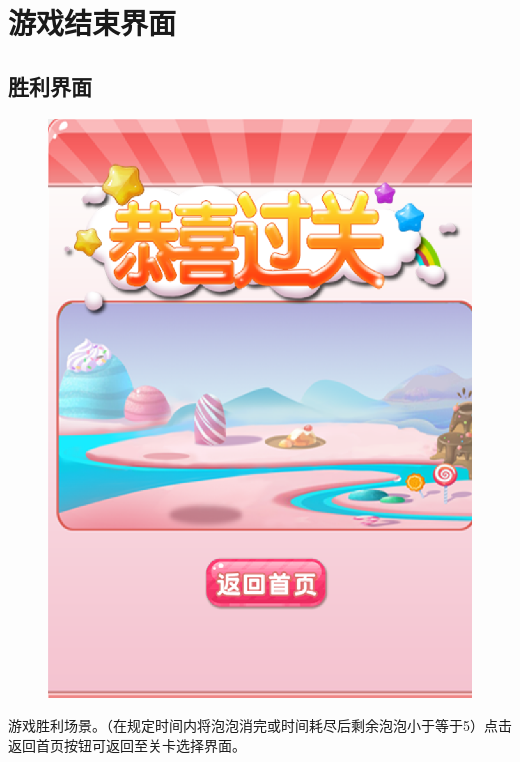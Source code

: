 \documentclass{article}
\begin{document}
        \section{游戏结束界面}
            \subsection{胜利界面}
            \begin{figure}[H]
                \centering
                \includegraphics[scale=0.5]{win.png}
            \end{figure}
            游戏胜利场景。（在规定时间内将泡泡消完或时间耗尽后剩余泡泡小于等于5）点击返回首页按钮可返回至关卡选择界面。
\end{document}
